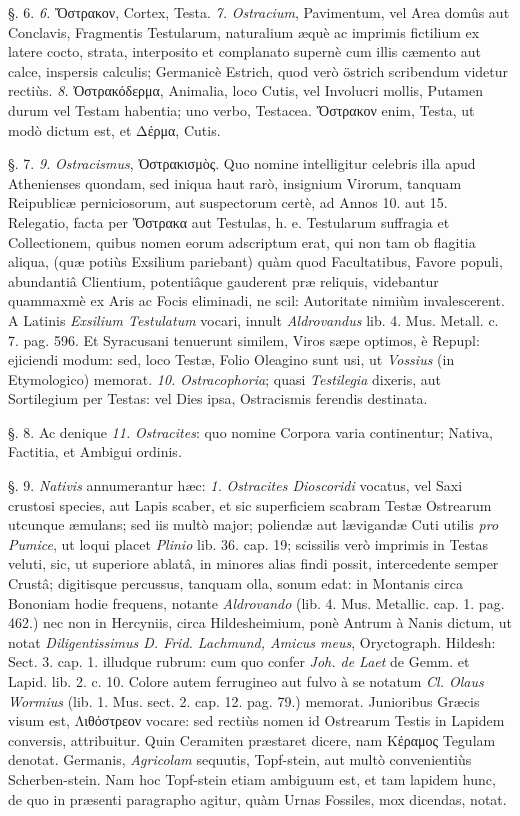 \documentclass[a4paper, 11pt, oneside, polutonikogreek, german]{article}
\begin{document}
§. 6. \emph{6.} Ὄστρακον, Cortex, Testa. \emph{7.} \emph{Ostracium}, Pavimentum, vel Area domûs aut Conclavis, Fragmentis Testularum, naturalium æquè ac imprimis fictilium ex latere cocto, strata, interposito et complanato supernè cum illis cæmento aut calce, inspersis calculis; Germanicè Estrich, quod verò östrich scribendum videtur rectiùs. \emph{8.} Ὀστρακόδερμα, Animalia, loco Cutis, vel Involucri mollis, Putamen durum vel Testam habentia; uno verbo, Testacea. Ὄστρακον enim, Testa, ut modò dictum est, et Δέρμα, Cutis.

§. 7. \emph{9.} \emph{Ostracismus}, Ὀστρακισμὸς. Quo nomine intelligitur celebris illa apud Athenienses quondam, sed iniqua haut rarò, insignium Virorum, tanquam Reipublicæ perniciosorum, aut suspectorum certè, ad Annos 10. aut 15. Relegatio, facta per Ὄστρακα aut Testulas, h. e. Testularum suffragia et Collectionem, quibus nomen eorum adscriptum erat, qui non tam ob flagitia aliqua, (quæ potiùs Exsilium pariebant) quàm quod Facultatibus, Favore populi, abundantiâ Clientium, potentiâque gauderent præ reliquis, videbantur quammaxmè ex Aris ac Focis eliminadi, ne scil: Autoritate nimiùm invalescerent. A Latinis \emph{Exsilium Testulatum} vocari, innult \emph{Aldrovandus} lib. 4. Mus. Metall. c. 7. pag. 596. Et Syracusani tenuerunt similem, Viros sæpe optimos, è Repupl: ejiciendi modum: sed, loco Testæ, Folio Oleagino sunt usi, ut \emph{Vossius} (in Etymologico) memorat. \emph{10.} \emph{Ostracophoria}; quasi \emph{Testilegia} dixeris, aut Sortilegium per Testas: vel Dies ipsa, Ostracismis ferendis destinata.

§. 8. Ac denique \emph{11.} \emph{Ostracites}: quo nomine Corpora varia continentur; Nativa, Factitia, et Ambigui ordinis.

§. 9. \emph{Nativis} annumerantur hæc: \emph{1.} \emph{Ostracites Dioscoridi} vocatus, vel Saxi crustosi species, aut Lapis scaber, et sic superficiem scabram Testæ Ostrearum utcunque æmulans; sed iis multò major; poliendæ aut lævigandæ Cuti utilis \emph{pro Pumice}, ut loqui placet \emph{Plinio} lib. 36. cap. 19; scissilis verò imprimis in Testas veluti, sic, ut superiore ablatâ, in minores alias findi possit, intercedente semper Crustâ; digitisque percussus, tanquam olla, sonum edat: in Montanis circa Bononiam hodie frequens, notante \emph{Aldrovando} (lib. 4. Mus. Metallic. cap. 1. pag. 462.) nec non in Hercyniis, circa Hildesheimium, ponè Antrum à Nanis dictum, ut notat \emph{Diligentissimus D. Frid. Lachmund, Amicus meus}, Oryctograph. Hildesh: Sect. 3. cap. 1. illudque rubrum: cum quo confer \emph{Joh. de Laet} de Gemm. et Lapid. lib. 2. c. 10. Colore autem ferrugineo aut fulvo à se notatum \emph{Cl. Olaus Wormius} (lib. 1. Mus. sect. 2. cap. 12. pag. 79.) memorat. Junioribus Græcis visum est, Λιθόστρεον vocare: sed rectiùs nomen id Ostrearum Testis in Lapidem conversis, attribuitur. Quin Ceramiten præstaret dicere, nam Κέραμος Tegulam denotat. Germanis, \emph{Agricolam} sequutis, Topf-stein, aut multò convenientiùs Scherben-stein. Nam hoc Topf-stein etiam ambiguum est, et tam lapidem hunc, de quo in præsenti paragrapho agitur, quàm Urnas Fossiles, mox dicendas, notat.
\end{document}
